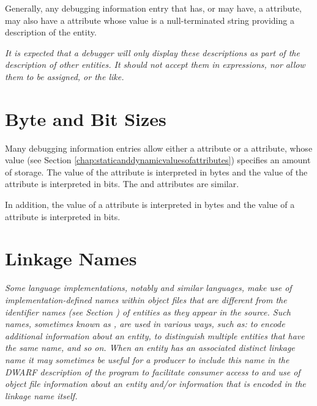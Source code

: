 Generally, any debugging information
entry that 
\hypertarget{chap:DWATdescriptionartificialnameordescription}{}
has, or may have, 
a 
\DWATname{} attribute, may
also have 
a 
\DWATdescription{} attribute whose value is a
null-terminated string providing a description of the entity.


\textit{It is expected that a debugger will only display these
descriptions as part of the description of other entities. It
should not accept them in expressions, nor allow them to be
assigned, or the like.}

\section{Byte and Bit Sizes}
\label{chap:byteandbitsizes}
Many debugging information entries allow either a
\DWATbytesize{} attribute or a 
\DWATbitsize{} attribute,
whose  value 
(see Section \ref{chap:staticanddynamicvaluesofattributes}) 
specifies an
amount of storage. The value of the 
\DWATbytesize{} attribute
is interpreted in bytes and the value of the 
\DWATbitsize{}
attribute is interpreted in bits. The
\DWATstringlengthbytesize{} and 
\DWATstringlengthbitsize{} 
attributes are similar.

In addition, the 
value of a \DWATbytestride{} attribute is interpreted
in bytes and the  value of a 
\DWATbitstride{}
attribute is interpreted in bits.

\section{Linkage Names}
\label{chap:linkagenames}
\textit{Some language implementations, notably 
 and similar
languages, 
make use of implementation-defined names within
object files that are different from the identifier names
(see Section ) of entities as they appear in the
source. Such names, sometimes known 
as 
,
are used in various ways, such as: to encode additional
information about an entity, to distinguish multiple entities
that have the same name, and so on. When an entity has an
associated distinct linkage name it may sometimes be useful
for a producer to include this name in the DWARF description
of the program to facilitate consumer access to and use of
object file information about an entity and/or information
\hypertarget{chap:DWATlinkagenameobjectfilelinkagenameofanentity}{}
that is encoded in the linkage name itself.  
}

